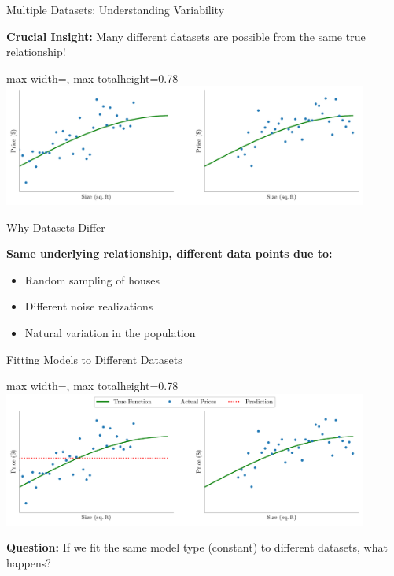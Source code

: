 \documentclass[10pt]{beamer}
\newcommand{\fitpic}[1]{\begin{adjustbox}{max width=\linewidth, max totalheight=0.78\textheight}#1\end{adjustbox}}
\begin{document}
\begin{frame}{Multiple Datasets: Understanding Variability}
\footnotesize
\begin{keypointsbox}
\raggedright
\textbf{Crucial Insight:} Many different datasets are possible from the same true relationship!
\end{keypointsbox}

\begin{center}
\fitpic{\includegraphics[width=0.9\textwidth]{../assets/bias-variance/figures/bias1.pdf}}
\end{center}
\end{frame}

\begin{frame}{Why Datasets Differ}
\footnotesize
\begin{examplebox}
\raggedright
\textbf{Same underlying relationship, different data points due to:}
\begin{itemize}
\item Random sampling of houses
\item Different noise realizations
\item Natural variation in the population
\end{itemize}
\end{examplebox}
\end{frame}

\begin{frame}{Fitting Models to Different Datasets}
\begin{center}
\fitpic{\includegraphics[width=0.9\textwidth]{../assets/bias-variance/figures/bias2.pdf}}
\end{center}

\begin{keypointsbox}
\raggedright
\textbf{Question:} If we fit the same model type (constant) to different datasets, what happens?
\end{keypointsbox}
\end{frame}
\end{document}
